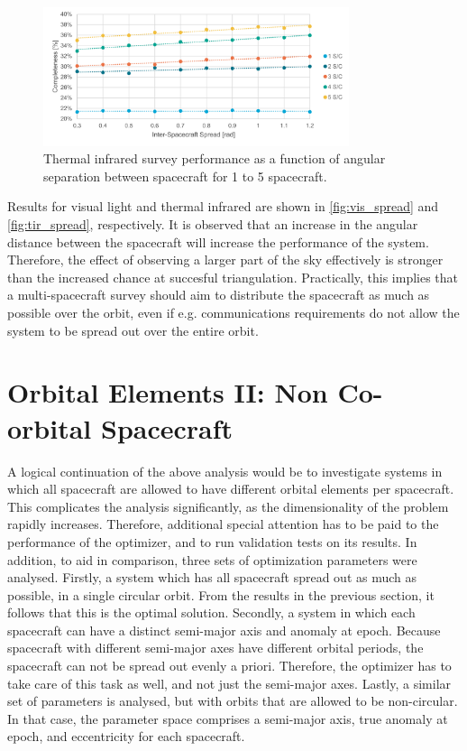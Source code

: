 \begin{figure}[htbp]
 \centering
 \includegraphics[width=0.8\textwidth]{img/tir_spread.pdf}
 \caption{Thermal infrared survey performance as a function of angular separation between spacecraft for 1 to 5 spacecraft.}
 \label{fig:tir_spread}
\end{figure}

Results for visual light and thermal infrared are shown in \autoref{fig:vis_spread} and \autoref{fig:tir_spread}, respectively. It is observed that an increase in the angular distance between the spacecraft will increase the performance of the system. Therefore, the effect of observing a larger part of the sky effectively is stronger than the increased chance at succesful triangulation. Practically, this implies that a multi-spacecraft survey should aim to distribute the spacecraft as much as possible over the orbit, even if e.g. communications requirements do not allow the system to be spread out over the entire orbit.

\section{Orbital Elements II: Non Co-orbital Spacecraft}
\label{sec:results_orbits_two}
A logical continuation of the above analysis would be to investigate systems in which all spacecraft are allowed to have different orbital elements per spacecraft. This complicates the analysis significantly, as the dimensionality of the problem rapidly increases. Therefore, additional special attention has to be paid to the performance of the optimizer, and to run validation tests on its results. In addition, to aid in comparison, three sets of optimization parameters were analysed. Firstly, a system which has all spacecraft spread out as much as possible, in a single circular orbit. From the results in the previous section, it follows that this is the optimal solution. Secondly, a system in which each spacecraft can have a distinct semi-major axis and anomaly at epoch. Because spacecraft with different semi-major axes have different orbital periods, the spacecraft can not be spread out evenly a priori. Therefore, the optimizer has to take care of this task as well, and not just the semi-major axes. Lastly, a similar set of parameters is analysed, but with orbits that are allowed to be non-circular. In that case, the parameter space comprises a semi-major axis, true anomaly at epoch, and eccentricity for each spacecraft.\\

